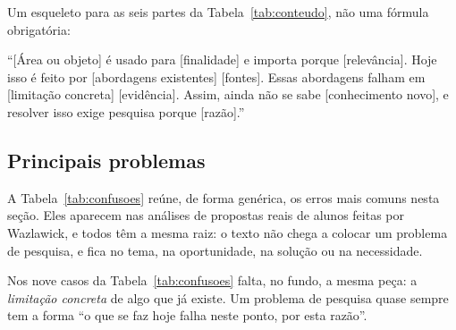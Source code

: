 \documentclass[10pt,a4paper]{extarticle}
\theoremstyle{definition}
\begin{document}
\begin{keybox}
Um esqueleto para as seis partes da Tabela~\ref{tab:conteudo}, não uma fórmula obrigatória:

\smallskip
\enquote{[Área ou objeto] é usado para [finalidade] e importa porque [relevância]. Hoje isso é feito por [abordagens existentes] [fontes]. Essas abordagens falham em [limitação concreta] [evidência]. Assim, ainda não se sabe [conhecimento novo], e resolver isso exige pesquisa porque [razão].}
\end{keybox}

\subsection{Principais problemas}

A Tabela~\ref{tab:confusoes} reúne, de forma genérica, os erros mais comuns nesta seção. Eles aparecem nas análises de propostas reais de alunos feitas por Wazlawick, e todos têm a mesma raiz: o texto não chega a colocar um problema de pesquisa, e fica no tema, na oportunidade, na solução ou na necessidade.

Nos nove casos da Tabela~\ref{tab:confusoes} falta, no fundo, a mesma peça: a \emph{limitação concreta} de algo que já existe. Um problema de pesquisa quase sempre tem a forma \enquote{o que se faz hoje falha neste ponto, por esta razão}.
\end{document}
